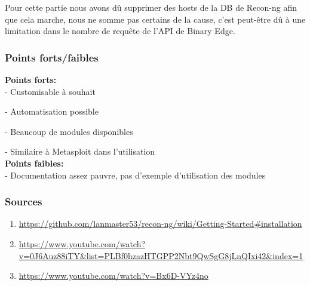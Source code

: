 Pour cette partie nous avons dû supprimer des hosts de la DB de Recon-ng afin que cela marche,
nous ne somme pas certains de la cause, c'est peut-être dû à une limitation dans le nombre de requête de l'API de Binary Edge.

\subsubsection{Points forts/faibles}

{\bfseries Points forts:} \\

- Customisable à souhait

- Automatisation possible

- Beaucoup de modules disponibles

- Similaire à Metasploit dans l'utilisation \\

{\bfseries Points faibles:} \\

- Documentation assez pauvre, pas d'exemple d'utilisation des modules

\subsubsection{Sources}
\begin{enumerate}
  \item \url{https://github.com/lanmaster53/recon-ng/wiki/Getting-Started#installation}
  \item \url{https://www.youtube.com/watch?v=0J6Auz88iTY&list=PLBf0hzazHTGPP2Nbt9QwSgG8jLnQIxi42&index=1}
  \item \url{https://www.youtube.com/watch?v=Bx6D-VYz4no}
\end{enumerate}